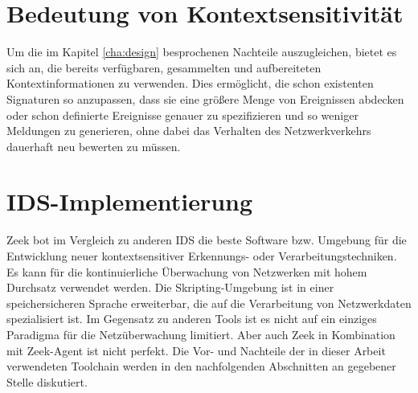 \section{Bedeutung von Kontextsensitivität}
Um die im Kapitel \ref{cha:design} besprochenen Nachteile auszugleichen, bietet es sich an, die bereits verfügbaren, gesammelten und aufbereiteten Kontextinformationen zu verwenden. Dies ermöglicht, die schon existenten Signaturen so anzupassen, dass sie eine größere Menge von Ereignissen abdecken oder schon definierte Ereignisse genauer zu spezifizieren und so weniger Meldungen zu generieren, ohne dabei das Verhalten des Netzwerkverkehrs dauerhaft neu bewerten zu müssen.
\section{IDS-Implementierung}
Zeek bot im Vergleich zu anderen IDS die beste Software bzw. Umgebung für die Entwicklung neuer kontextsensitiver Erkennungs- oder Verarbeitungstechniken. Es kann für die kontinuierliche Überwachung von Netzwerken mit hohem Durchsatz verwendet werden. Die Skripting-Umgebung ist in einer speichersicheren Sprache erweiterbar, die auf die Verarbeitung von Netzwerkdaten spezialisiert ist. Im Gegensatz zu anderen Tools ist es nicht auf ein einziges Paradigma für die Netzüberwachung limitiert.
Aber auch Zeek in Kombination mit Zeek-Agent ist nicht perfekt. Die Vor- und Nachteile der in dieser Arbeit verwendeten Toolchain werden in den nachfolgenden Abschnitten an gegebener Stelle diskutiert.
